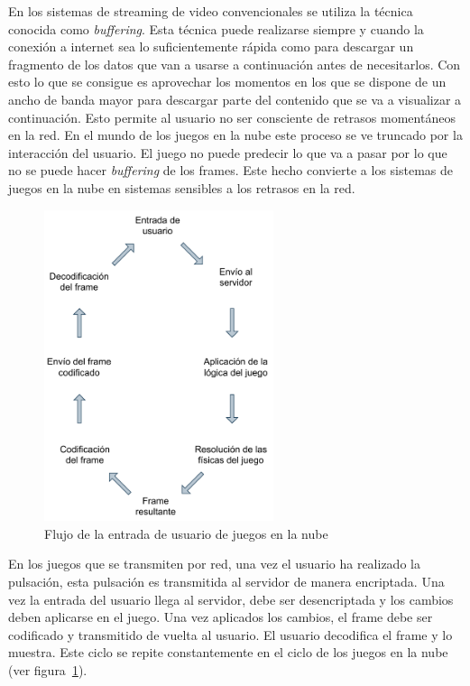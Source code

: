 En los sistemas de streaming de video convencionales se utiliza la t\'ecnica conocida como \textit{buffering}. Esta t\'ecnica puede realizarse siempre y cuando la conexi\'on a internet sea lo suficientemente r\'apida como para descargar un fragmento de los datos que van a usarse a continuaci\'on antes de necesitarlos. Con esto lo que se consigue es aprovechar los momentos en los que se dispone de un ancho de banda mayor para descargar parte del contenido que se va a visualizar a continuaci\'on. Esto permite al usuario no ser consciente de retrasos moment\'aneos en la red. En el mundo de los juegos en la nube este proceso se ve truncado por la interacci\'on del usuario. El juego no puede predecir lo que va a pasar por lo que no se puede hacer \textit{buffering} de los frames. Este hecho convierte a los sistemas de juegos en la nube en sistemas sensibles a los retrasos en la red.\\

\begin{figure}[h]

\centering
\includegraphics[width=0.6\textwidth]{./Imagenes/Vectorial/cloudgaming cycle.pdf}
\caption{Flujo de la entrada de usuario de juegos en la nube}
\label{cycle}
\end{figure}

En los juegos que se transmiten por red, una vez el usuario ha realizado la pulsaci\'on, esta pulsaci\'on es transmitida al servidor de manera encriptada. Una vez la entrada del usuario llega al servidor, debe ser desencriptada y los cambios deben aplicarse en el juego. Una vez aplicados los cambios, el frame debe ser codificado y transmitido de vuelta al usuario. El usuario decodifica el frame y lo muestra. Este ciclo se repite constantemente en el ciclo de los juegos en la nube (ver figura~\ref{cycle}).\\

